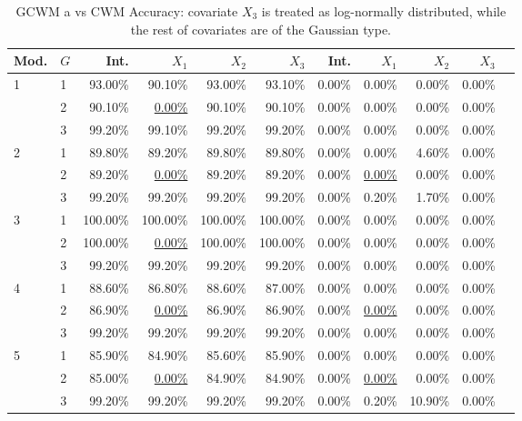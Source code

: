 \documentclass[12pt,letterpaper]{article}
\numberwithin{equation}{section}
\numberwithin{equation}{section}
\numberwithin{equation}{section}
\begin{document}
\begin{table}[!htb]
\centering
\caption{GCWM a vs CWM Accuracy: covariate $X_3$ is treated as log-normally distributed, while the rest of covariates are of the Gaussian type.}
\label{gcwmAccuracy}
\begin{tabular}{ll|rrrr|rrrrr}
\hline
Mod. & $G$ & Int. & $X_1$ &$X_2$ & $X_3$& Int. & $X_1$ &$X_2$ & $X_3$  \\
\hline
1     & 1         & 93.00\%   & 90.10\%  & 93.00\%  & 93.10\% & 0.00\% & 0.00\% & 0.00\% & 0.00\%   \\
      & 2         & 90.10\%   & \underline{0.00\%}   & 90.10\%  & 90.10\% & 0.00\% & 0.00\% & 0.00\% & 0.00\%  \\
      & 3         & 99.20\%   & 99.10\%  & 99.20\%  & 99.20\% & 0.00\% & 0.00\% & 0.00\% & 0.00\%  \\
      \hline
2     & 1         & 89.80\%   & 89.20\%  & 89.80\%  & 89.80\% & 0.00\% & 0.00\% & 4.60\% & 0.00\%  \\
      & 2         & 89.20\%   &\underline{0.00\%}   & 89.20\%  & 89.20\% & 0.00\% & \underline{0.00\%} & 0.00\% & 0.00\%   \\
      & 3         & 99.20\%   & 99.20\%  & 99.20\%  & 99.20\% & 0.00\% & 0.20\% & 1.70\% & 0.00\%  \\
      \hline
3     & 1         & 100.00\%  & 100.00\% & 100.00\% & 100.00\%  & 0.00\% & 0.00\% & 0.00\% & 0.00\% \\
      & 2         & 100.00\%  & \underline{0.00\%}   & 100.00\% & 100.00\% & 0.00\% & 0.00\% & 0.00\% & 0.00\% \\
      & 3         & 99.20\%   & 99.20\%  & 99.20\%  & 99.20\%  & 0.00\% & 0.00\% & 0.00\% & 0.00\%\\
      \hline
      4 & 1 & 88.60\% & 86.80\% & 88.60\% & 87.00\%  & 0.00\% & 0.00\% & 0.00\%  & 0.00\%  \\
  & 2 & 86.90\% &\underline{ 0.00\%}  & 86.90\% & 86.90\% & 0.00\% & \underline{0.00\%} & 0.00\%  & 0.00\%  \\
  & 3 & 99.20\% & 99.20\% & 99.20\% & 99.20\% & 0.00\% & 0.00\% & 0.00\%  & 0.00\% \\
      \hline
5 & 1 & 85.90\% & 84.90\% & 85.60\% & 85.90\% & 0.00\% & 0.00\% & 0.00\%  & 0.00\% \\
  & 2 & 85.00\% &\underline{ 0.00\%}  & 84.90\% & 84.90\% & 0.00\% & \underline{0.00\%} & 0.00\%  & 0.00\%  \\
  & 3 & 99.20\% & 99.20\% & 99.20\% & 99.20\% & 0.00\% & 0.20\% & 10.90\% & 0.00\% \\
      \hline
\end{tabular}
\end{table}
\end{document}
